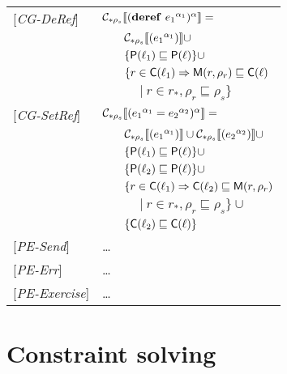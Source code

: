 \begin{tabular} {l l l l}
{[\textit{CG-DeRef}]}&\multicolumn{3}{l}{$\mathcal{C}_{*\rho_s}\llbracket (\mathbf{deref}\ {e_1}^{\alpha_1})^\alpha \rrbracket = $}\\
&&\multicolumn{2}{l}{$ \mathcal{C}_{*\rho_s}\llbracket ({e_1}^{\alpha_1}) \rrbracket \cup$}\\
&&\multicolumn{2}{l}{$\{ \mathsf{P}(\ell_1) \sqsubseteq \mathsf{P}(\ell) \} \cup$}\\
&&\multicolumn{2}{l}{$\{r \in \mathsf{C}(\ell_1) \Rightarrow \mathsf{M}(r, \rho_r) \sqsubseteq \mathsf{C}(\ell)$} \\
&&&$|\ r \in r_*, \rho_r \sqsubseteq \rho_s\}$\\
{[\textit{CG-SetRef}]}&\multicolumn{3}{l}{$\mathcal{C}_{*\rho_s}\llbracket ({e_1}^{\alpha_1} = {e_2}^{\alpha_2})^\alpha \rrbracket = $}\\
&&\multicolumn{2}{l}{$ \mathcal{C}_{*\rho_s}\llbracket ({e_1}^{\alpha_1}) \rrbracket \cup \mathcal{C}_{*\rho_s}\llbracket ({e_2}^{\alpha_2}) \rrbracket \cup $}\\
&&\multicolumn{2}{l}{$ \{ \mathsf{P}(\ell_1) \sqsubseteq \mathsf{P}(\ell) \} \cup$}\\
&&\multicolumn{2}{l}{$ \{ \mathsf{P}(\ell_2) \sqsubseteq \mathsf{P}(\ell) \} \cup$}\\
&&\multicolumn{2}{l}{$\{r \in \mathsf{C}(\ell_1) \Rightarrow \mathsf{C}(\ell_2) \sqsubseteq \mathsf{M}(r, \rho_r)$}\\
&&&$|\ r \in r_*, \rho_r \sqsubseteq \rho_s\}\cup$ \\
&&\multicolumn{2}{l}{$\{ \mathsf{C}(\ell_2) \sqsubseteq \mathsf{C}(\ell) \}$} \\
{[\textit{PE-Send}]}& \dots \\
{[\textit{PE-Err}]}& \dots \\
{[\textit{PE-Exercise}]}& \dots \\
\end{tabular}

\section{Constraint solving}
\label{sec:ConstraintSolving}

